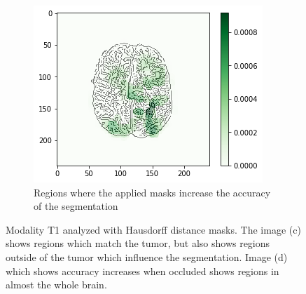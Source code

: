 \begin{figure}[H]
\begin{subfigure}[t]{.45\textwidth}
    \end{subfigure}\hspace{1cm}%
    \begin{subfigure}[t]{.45\textwidth}
        \centering
        \includegraphics[width=\linewidth]{chapters/06_hdm/b_Brats18_TCIA08_242_1_L2/24.png}
        \caption{Regions where the applied masks increase the accuracy of the segmentation}
    \end{subfigure}
    \caption{Modality T1 analyzed with Hausdorff distance masks. The image (c) shows regions which match the tumor, but also shows regions outside of the tumor which influence the segmentation. Image (d) which shows accuracy increases when occluded shows regions in almost the whole brain.}
    \label{brats_tcia08_t1}
\end{figure}


